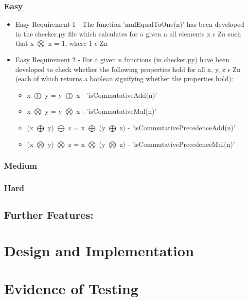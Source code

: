\documentclass[11]{article}
\begin{document}
	 	\subsubsection{Easy}
			\begin{itemize}
				\item Easy Requirement 1 - The function 'mulEqualToOne(n)' has been developed in the checker.py file which calculates for a given n all elements x $\epsilon$ Zn such that x $\bigotimes$ x = 1, where 1 $\epsilon$ Zn
				\item Easy Requirement 2 - For a given n functions (in checker.py) have been developed to check whether the following properties hold for all x, y, z $\epsilon$ Zn (each of which returns a boolean signifying whether the properties hold):
				\begin{itemize}
					\item x $\bigoplus$ y = y $\bigoplus$ x - 'isCommutativeAdd(n)'
					\item x $\bigotimes$ y = y $\bigotimes$ x - 'isCommutativeMul(n)'
					\item (x $\bigoplus$ y) $\bigoplus$ z = x $\bigoplus$ (y $\bigoplus$ z) - 'isCommutativePrecedenceAdd(n)'
					\item (x $\bigotimes$ y) $\bigotimes$ z = x $\bigotimes$ (y $\bigotimes$ z) - 'isCommutativePrecedenceMul(n)'
				\end{itemize}
			\end{itemize}

		\subsubsection{Medium}

		\subsubsection{Hard}

	\subsection{Further Features:}

	\section{Design and Implementation}

		
	\section{Evidence of Testing}	
\end{document}

